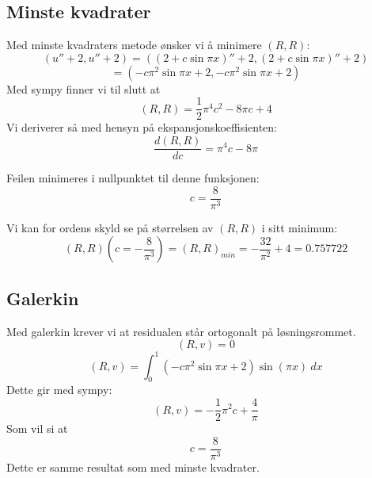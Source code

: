 \documentclass[a4paper, 10pt]{article}
\begin{document}
\subsection{Minste kvadrater}
Med minste kvadraters metode ønsker vi å minimere $(R, R)$:
\begin{equation}
	(u''+2, u'' +2) = ((2+c\sin{\pi x})''+2, (2+c\sin{\pi x})''+2)
\end{equation}
\begin{equation}
	= (-c\pi^2\sin{\pi x}+2, -c\pi^2\sin{\pi x}+2)
\end{equation}
Med sympy finner vi til slutt at 
\begin{equation}
	(R, R) = \frac{1}{2} \pi^{4} c^{2} - 8 \pi c + 4
\end{equation}
Vi deriverer så med hensyn på ekspansjonskoeffisienten:
\begin{equation}
	\frac{d(R, R)}{dc} = \pi^4 c - 8\pi
\end{equation}

Feilen minimeres i nullpunktet til denne funksjonen:
\begin{equation}
	c = \frac{8}{\pi^3}
\end{equation}

Vi kan for ordens skyld se på størrelsen av $(R, R)$ i sitt minimum:
\begin{equation}
	(R, R)(c=-\frac{8}{\pi^3}) = (R,R)_{min} = - \frac{32}{\pi^{2}} + 4 = 0.757722
\end{equation}

\subsection{Galerkin}
Med galerkin krever vi at residualen står ortogonalt på løsningsrommet.
\begin{equation}
	(R, v) = 0
\end{equation}
\begin{equation}
	(R, v) = \int_0^1 (-c\pi^2\sin{\pi x}+2)\sin(\pi x) \ dx
\end{equation}
Dette gir med sympy:
\begin{equation}
	(R, v) = - \frac{1}{2} \pi^{2} c + \frac{4}{\pi}
\end{equation}
Som vil si at 
\begin{equation}
	c = \frac{8}{\pi^{3}}
\end{equation}
Dette er samme resultat som med minste kvadrater. 
\end{document}

